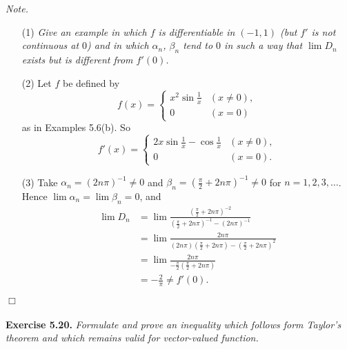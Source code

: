 \documentclass{article}
\begin{document}
\emph{Note.}
\begin{enumerate}
  \item[(1)]
  \emph{Give an example in which $f$ is differentiable in $(-1,1)$
  (but $f'$ is not continuous at $0$) and in which
  $\alpha_n$, $\beta_n$ tend to $0$ in such a way that $\lim{D_n}$ exists
  but is different from $f'(0)$.}

  \item[(2)]
  Let $f$ be defined by
  \begin{equation*}
    f(x) =
    \begin{cases}
      x^2 \sin \frac{1}{x} & (x \neq 0), \\
      0                    & (x = 0)
    \end{cases}
  \end{equation*}
  as in Examples 5.6(b).
  So
  \begin{equation*}
    f'(x) =
    \begin{cases}
      2x \sin\frac{1}{x} - \cos\frac{1}{x} & (x \neq 0), \\
      0                                    & (x = 0).
    \end{cases}
  \end{equation*}

  \item[(3)]
  Take $\alpha_n = \left(2n\pi \right)^{-1} \neq 0$
  and $\beta_n = \left(\frac{\pi}{2} + 2n\pi \right)^{-1} \neq 0$
  for $n = 1, 2, 3, \ldots$.
  Hence $\lim \alpha_n = \lim \beta_n = 0$, and
  \begin{align*}
    \lim D_n
    &=
    \lim \frac{\left(\frac{\pi}{2} + 2n\pi \right)^{-2}}
      {\left(\frac{\pi}{2} + 2n\pi \right)^{-1} - \left(2n\pi \right)^{-1}} \\
    &=
    \lim \frac{2n\pi}{(2n\pi)\left(\frac{\pi}{2} + 2n\pi \right)
      - \left(\frac{\pi}{2} + 2n\pi \right)^2} \\
    &=
    \lim \frac{2n\pi}{-\frac{\pi}{2}\left(\frac{\pi}{2} + 2n\pi \right)} \\
    &= -\frac{2}{\pi} \neq f'(0).
  \end{align*}
\end{enumerate}
$\Box$ \\\\






\textbf{Exercise 5.20.}
\emph{Formulate and prove an inequality which follows form Taylor's theorem and
which remains valid for vector-valued function.} \\
\end{document}
